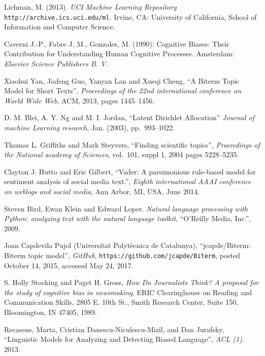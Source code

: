 \documentclass[final]{ieee}
\begin{document}
\begin{thebibliography}{99}
   Lichman, M. (2013). {\it UCI Machine Learning Repository} \texttt{http://archive.ics.uci.edu/ml}. Irvine, CA: University of California, School of Information and Computer Science.

   Caverni J.-P., Fabre J. M., Gonzales, M. (1990): Cognitive Biases: Their Contribution for Understanding Human Cognitive Processes. Amsterdam: {\it Elsevier Science Publishers B. V.}

   Xiaohui Yan, Jiafeng Guo, Yanyan Lan and Xueqi Cheng, 
   ``A Biterm Topic Model for Short Texts'', {\it Proceedings of the 22nd international conference on 
   World Wide Web}, ACM, 2013, pages 1445--1456.

   D. M. Blei, A. Y. Ng and M. I. Jordan, ``Latent Dirichlet Allocation'' {\it Journal of machine Learning research},  Jan. (2003), pp.~993--1022.
   
    Thomas L. Griffiths and Mark Steyvers, 
   ``Finding scientific topics'', {\it Proceedings of the National academy of Sciences}, vol.~101, suppl 1, 2004 pages 5228--5235.
   
    Clayton J. Hutto and Eric Gilbert, 
   ``Vader: A parsimonious rule-based model for sentiment analysis of social media text.'', {\it  Eighth international AAAI conference on weblogs and social media}, Ann Arbor, MI, USA, June 2014.
   
    Steven Bird, Ewan Klein and Edward Loper. {\it Natural language processing with Python: analyzing text with the natural language toolkit}, ``O'Reilly Media, Inc.'', 2009.
   
    Joan Capdevila Pujol (Universitat Polyt\`{e}cnica de Catalunya), ``jcapde/Biterm: Biterm topic model'', {\it GitHub}, \texttt{https://github.com/jcapde/Biterm}, posted October 14, 2015, accessed May 24, 2017.

    S. Holly Stocking and Paget H. Gross, {\it How Do Journalists Think? A proposal for the study of cognitive bias in newsmaking}, ERIC Clearinghouse on Reading and Communication Skills, 2805 E. 10th St., Smith Research Center, Suite 150, Bloomington, IN 47405, 1989.
   
    Recasens, Marta, Cristian Danescu-Niculescu-Mizil, and Dan Jurafsky, ``Linguistic Models for Analyzing and Detecting Biased Language'', {\it ACL (1).} 2013.
   

\end{thebibliography}
\end{document}
